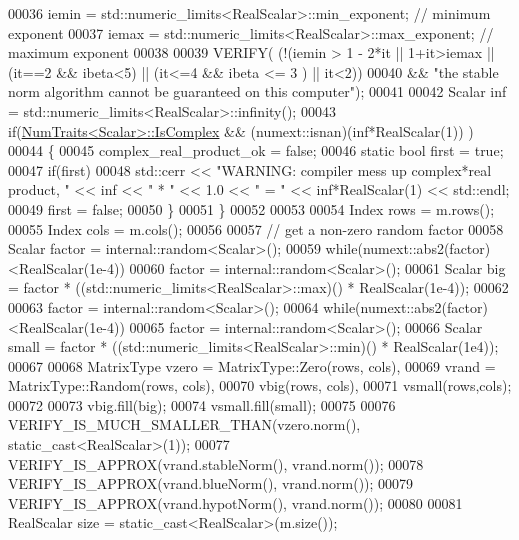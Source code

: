 \begin{DoxyCode}
00036     iemin = std::numeric\_limits<RealScalar>::min\_exponent;  \textcolor{comment}{// minimum exponent}
00037     iemax = std::numeric\_limits<RealScalar>::max\_exponent;  \textcolor{comment}{// maximum exponent}
00038 
00039     VERIFY( (!(iemin > 1 - 2*it || 1+it>iemax || (it==2 && ibeta<5) || (it<=4 && ibeta <= 3 ) || it<2))
00040            && \textcolor{stringliteral}{"the stable norm algorithm cannot be guaranteed on this computer"});
00041     
00042     Scalar inf = std::numeric\_limits<RealScalar>::infinity();
00043     \textcolor{keywordflow}{if}(\hyperlink{group___core___module_struct_eigen_1_1_num_traits}{NumTraits<Scalar>::IsComplex} && (numext::isnan)(inf*RealScalar(1)) )
00044     \{
00045       complex\_real\_product\_ok = \textcolor{keyword}{false};
00046       \textcolor{keyword}{static} \textcolor{keywordtype}{bool} first = \textcolor{keyword}{true};
00047       \textcolor{keywordflow}{if}(first)
00048         std::cerr << \textcolor{stringliteral}{"WARNING: compiler mess up complex*real product, "} << inf << \textcolor{stringliteral}{" * "} << 1.0 << \textcolor{stringliteral}{" = "} << 
      inf*RealScalar(1) << std::endl;
00049       first = \textcolor{keyword}{false};
00050     \}
00051   \}
00052 
00053 
00054   Index rows = m.rows();
00055   Index cols = m.cols();
00056 
00057   \textcolor{comment}{// get a non-zero random factor}
00058   Scalar factor = internal::random<Scalar>();
00059   \textcolor{keywordflow}{while}(numext::abs2(factor)<RealScalar(1e-4))
00060     factor = internal::random<Scalar>();
00061   Scalar big = factor * ((std::numeric\_limits<RealScalar>::max)() * RealScalar(1e-4));
00062   
00063   factor = internal::random<Scalar>();
00064   \textcolor{keywordflow}{while}(numext::abs2(factor)<RealScalar(1e-4))
00065     factor = internal::random<Scalar>();
00066   Scalar small = factor * ((std::numeric\_limits<RealScalar>::min)() * RealScalar(1e4));
00067 
00068   MatrixType  vzero = MatrixType::Zero(rows, cols),
00069               vrand = MatrixType::Random(rows, cols),
00070               vbig(rows, cols),
00071               vsmall(rows,cols);
00072 
00073   vbig.fill(big);
00074   vsmall.fill(small);
00075 
00076   VERIFY\_IS\_MUCH\_SMALLER\_THAN(vzero.norm(), \textcolor{keyword}{static\_cast<}RealScalar\textcolor{keyword}{>}(1));
00077   VERIFY\_IS\_APPROX(vrand.stableNorm(),      vrand.norm());
00078   VERIFY\_IS\_APPROX(vrand.blueNorm(),        vrand.norm());
00079   VERIFY\_IS\_APPROX(vrand.hypotNorm(),       vrand.norm());
00080 
00081   RealScalar size = \textcolor{keyword}{static\_cast<}RealScalar\textcolor{keyword}{>}(m.size());

\end{DoxyCode}
